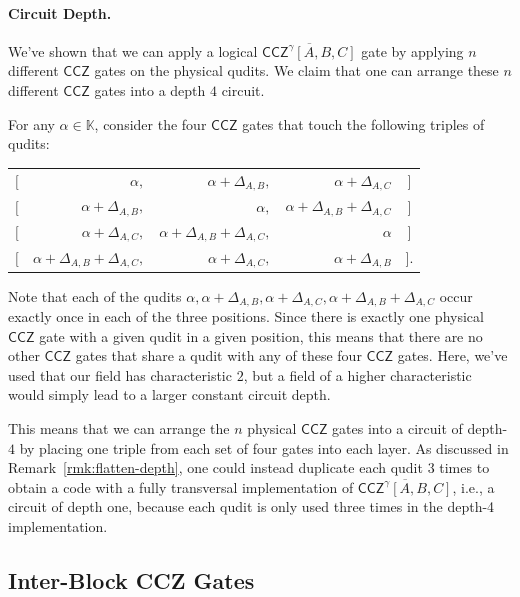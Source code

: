 \documentclass[11pt]{article}
\theoremstyle{definition}
\newcommand{\CCZ}{\mathsf{CCZ}}
\newcommand{\KK}{\mathbb{K}}
\newcommand*{\ol}{\overline}
\begin{document}
\paragraph{Circuit Depth.}
We've shown that we can apply a logical $\ol{\CCZ^\gamma[A,B,C]}$ gate by applying $n$ different $\CCZ$ gates on the physical qudits. We claim that one can arrange these $n$ different $\CCZ$ gates into a depth $4$ circuit.

For any $\alpha \in \KK$, consider the four $\CCZ$ gates that touch the following triples of qudits:
\begin{center}
\begin{tabular}{crrrc}
    $[$ & $\alpha,$ & $\alpha + \Delta_{A,B},$ & $\alpha + \Delta_{A,C}$ & $]$ \\
    $[$ & $\alpha + \Delta_{A,B},$ & $\alpha,$ & $\alpha + \Delta_{A,B} + \Delta_{A,C}$ & $]$ \\
    $[$ & $\alpha + \Delta_{A,C},$ & $\alpha + \Delta_{A,B} + \Delta_{A,C},$ & $\alpha$ & $]$ \\
    $[$ & $\alpha + \Delta_{A,B} + \Delta_{A,C},$ & $\alpha + \Delta_{A,C},$ & $\alpha + \Delta_{A,B}$ & $]$.
\end{tabular}
\end{center}
Note that each of the qudits $\alpha, \alpha + \Delta_{A,B}, \alpha + \Delta_{A,C}, \alpha + \Delta_{A,B} + \Delta_{A,C}$ occur exactly once in each of the three positions. Since there is exactly one physical $\CCZ$ gate with a given qudit in a given position, this means that there are no other $\CCZ$ gates that share a qudit with any of these four $\CCZ$ gates. Here, we've used that our field has characteristic $2$, but a field of a higher characteristic would simply lead to a larger constant circuit depth.

This means that we can arrange the $n$ physical $\CCZ$ gates into a circuit of depth-$4$ by placing one triple from each set of four gates into each layer. As discussed in Remark~\ref{rmk:flatten-depth}, one could instead duplicate each qudit $3$ times to obtain a code with a fully transversal implementation of $\ol{\CCZ^\gamma[A,B,C]}$, i.e., a circuit of depth one, because each qudit is only used three times in the depth-4 implementation.



\subsection{Inter-Block CCZ Gates}
\end{document}
